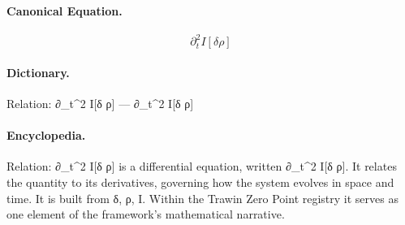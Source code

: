 \paragraph{Canonical Equation.}
\[
\partial_t^2 I[\delta \rho]
\]

\paragraph{Dictionary.}
Relation: ∂\_t\textasciicircum{}2 I[δ ρ] — ∂\_t\textasciicircum{}2 I[δ ρ]

\paragraph{Encyclopedia.}
Relation: ∂\_t\textasciicircum{}2 I[δ ρ] is a differential equation, written ∂\_t\textasciicircum{}2 I[δ ρ]. It relates the quantity to its derivatives, governing how the system evolves in space and time. It is built from δ, ρ, I. Within the Trawin Zero Point registry it serves as one element of the framework's mathematical narrative.

